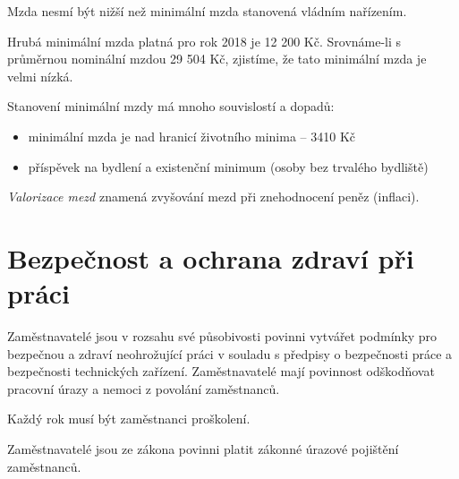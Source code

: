 \documentclass[11pt,a4paper,twoside]{book}
\begin{document}
	Mzda nesmí být nižší než minimální mzda stanovená vládním nařízením.

	Hrubá minimální mzda platná pro rok 2018 je 12 200 Kč. Srovnáme-li s průměrnou nominální mzdou 29 504 Kč, zjistíme, že tato minimální mzda je velmi nízká.

	Stanovení minimální mzdy má mnoho souvislostí a dopadů:
	\begin{itemize}
		\item minimální mzda je nad hranicí životního minima -- 3410 Kč
		\item příspěvek na bydlení a existenční minimum (osoby bez trvalého bydliště)
	\end{itemize}

	\emph{Valorizace mezd} znamená zvyšování mezd při znehodnocení peněz (inflaci).

	\section*{Bezpečnost a ochrana zdraví při práci}

	Zaměstnavatelé jsou v rozsahu své působivosti povinni vytvářet podmínky pro bezpečnou a zdraví neohrožující práci v souladu s předpisy o bezpečnosti práce a bezpečnosti technických zařízení. Zaměstnavatelé mají povinnost odškodňovat pracovní úrazy a nemoci z povolání 	zaměstnanců.

	Každý rok musí být zaměstnanci proškolení.

	Zaměstnavatelé jsou ze zákona povinni platit zákonné úrazové pojištění zaměstnanců.
\end{document}
